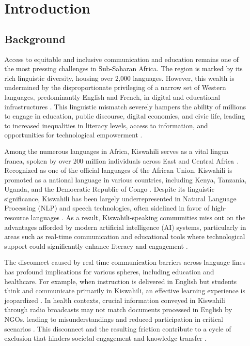 \chapter{Introduction}
\section{Background}
Access to equitable and inclusive communication and education remains one of the most pressing challenges in Sub-Saharan Africa. The region is marked by its rich linguistic diversity, housing over 2,000 languages. However, this wealth is undermined by the disproportionate privileging of a narrow set of Western languages, predominantly English and French, in digital and educational infrastructures \cite{Darvas_Ballal_Feda_2014}. This linguistic mismatch severely hampers the ability of millions to engage in education, public discourse, digital economies, and civic life, leading to increased inequalities in literacy levels, access to information, and opportunities for technological empowerment \cite{asare2020equitable}.


\noindent Among the numerous languages in Africa, Kiswahili serves as a vital lingua franca, spoken by over 200 million individuals across East and Central Africa \cite{hu2011speech}. Recognized as one of the official languages of the African Union, Kiswahili is promoted as a national language in various countries, including Kenya, Tanzania, Uganda, and the Democratic Republic of Congo \cite{asare2020equitable}. Despite its linguistic significance, Kiswahili has been largely underrepresented in Natural Language Processing (NLP) and speech technologies, often sidelined in favor of high-resource languages \cite{pratama2024analysis}. As a result, Kiswahili-speaking communities miss out on the advantages afforded by modern artificial intelligence (AI) systems, particularly in areas such as real-time communication and educational tools where technological support could significantly enhance literacy and engagement \cite{pratama2024analysis}.

\noindent The disconnect caused by real-time communication barriers across language lines has profound implications for various spheres, including education and healthcare. For example, when instruction is delivered in English but students think and communicate primarily in Kiswahili, an effective learning experience is jeopardized \cite{asare2020equitable}. In health contexts, crucial information conveyed in Kiswahili through radio broadcasts may not match documents processed in English by NGOs, leading to misunderstandings and reduced participation in critical scenarios \cite{alharbi2021automatic}. This disconnect and the resulting friction contribute to a cycle of exclusion that hinders societal engagement and knowledge transfer \cite{pratama2024analysis}.


